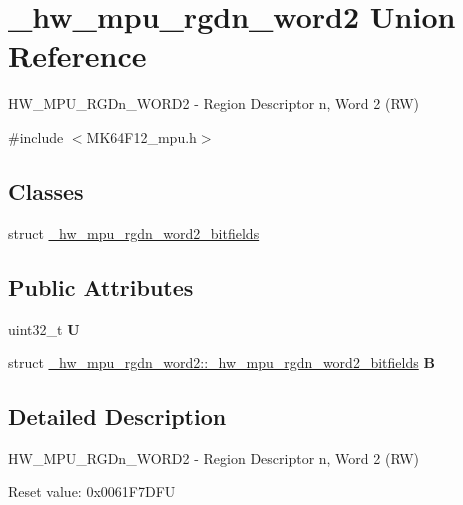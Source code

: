 \hypertarget{union__hw__mpu__rgdn__word2}{}\section{\+\_\+hw\+\_\+mpu\+\_\+rgdn\+\_\+word2 Union Reference}
\label{union__hw__mpu__rgdn__word2}


H\+W\+\_\+\+M\+P\+U\+\_\+\+R\+G\+Dn\+\_\+\+W\+O\+R\+D2 -\/ Region Descriptor n, Word 2 (RW)  




{\ttfamily \#include $<$M\+K64\+F12\+\_\+mpu.\+h$>$}

\subsection*{Classes}
\begin{DoxyCompactItemize}
\item 
struct \hyperlink{struct__hw__mpu__rgdn__word2_1_1__hw__mpu__rgdn__word2__bitfields}{\+\_\+hw\+\_\+mpu\+\_\+rgdn\+\_\+word2\+\_\+bitfields}
\end{DoxyCompactItemize}
\subsection*{Public Attributes}
\begin{DoxyCompactItemize}
\item 
uint32\+\_\+t {\bfseries U}\hypertarget{union__hw__mpu__rgdn__word2_a70520f2535a34e504680e87cab4fd89b}{}\label{union__hw__mpu__rgdn__word2_a70520f2535a34e504680e87cab4fd89b}

\item 
struct \hyperlink{struct__hw__mpu__rgdn__word2_1_1__hw__mpu__rgdn__word2__bitfields}{\+\_\+hw\+\_\+mpu\+\_\+rgdn\+\_\+word2\+::\+\_\+hw\+\_\+mpu\+\_\+rgdn\+\_\+word2\+\_\+bitfields} {\bfseries B}\hypertarget{union__hw__mpu__rgdn__word2_a2390eb3e73f4be7a54e2c222c66da5f5}{}\label{union__hw__mpu__rgdn__word2_a2390eb3e73f4be7a54e2c222c66da5f5}

\end{DoxyCompactItemize}


\subsection{Detailed Description}
H\+W\+\_\+\+M\+P\+U\+\_\+\+R\+G\+Dn\+\_\+\+W\+O\+R\+D2 -\/ Region Descriptor n, Word 2 (RW) 

Reset value\+: 0x0061\+F7\+D\+FU

